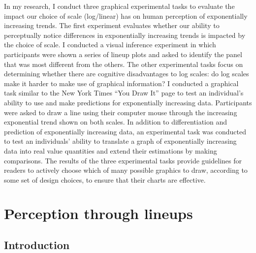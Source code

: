 \documentclass[print]{nuthesis}
\begin{document}
In my research, I conduct three graphical experimental tasks to evaluate the impact our choice of scale (log/linear) has on human perception of exponentially increasing trends.
The first experiment evaluates whether our ability to perceptually notice differences in exponentially increasing trends is impacted by the choice of scale. I conducted a visual inference experiment in which participants were shown a series of lineup plots and asked to identify the panel that was most different from the others.
The other experimental tasks focus on determining whether there are cognitive disadvantages to log scales: do log scales make it harder to make use of graphical information?
I conducted a graphical task similar to the New York Times ``You Draw It'' page to test an individual's ability to use and make predictions for exponentially increasing data.
Participants were asked to draw a line using their computer mouse through the increasing exponential trend shown on both scales.
In addition to differentiation and prediction of exponentially increasing data, an experimental task was conducted to test an individuals' ability to translate a graph of exponentially increasing data into real value quantities and extend their estimations by making comparisons.
The results of the three experimental tasks provide guidelines for readers to actively choose which of many possible graphics to draw, according to some set of design choices, to ensure that their charts are effective.

\hypertarget{lineups}{%
\chapter{Perception through lineups}\label{lineups}}

\hypertarget{introduction}{%
\section{Introduction}\label{introduction}}
\end{document}
